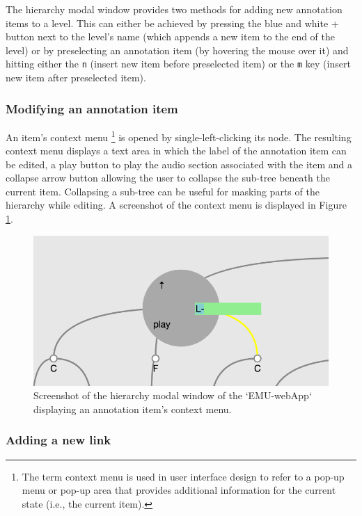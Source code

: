 \documentclass[]{book}
\let\rmarkdownfootnote\footnote%
\def\footnote{\protect\rmarkdownfootnote}
\begin{document}
The hierarchy modal window provides two methods for adding new annotation items to a level. This can either be achieved by pressing the blue and white + button next to the level's name (which appends a new item to the end of the level) or by preselecting an annotation item (by hovering the mouse over it) and hitting either the \texttt{n} (insert new item before preselected item) or the \texttt{m} key (insert new item after preselected item).

\hypertarget{modifying-an-annotation-item}{%
\subsubsection{Modifying an annotation item}\label{modifying-an-annotation-item}}

An item's context menu \footnote{The term context menu is used in user interface design to refer to a pop-up menu or pop-up area that provides additional information for the current state (i.e., the current item).} is opened by single-left-clicking its node. The resulting context menu displays a text area in which the label of the annotation item can be edited, a play button to play the audio section associated with the item and a collapse arrow button allowing the user to collapse the sub-tree beneath the current item. Collapsing a sub-tree can be useful for masking parts of the hierarchy while editing. A screenshot of the context menu is displayed in Figure \ref{fig:webApp-hierContextMenu}.

\begin{figure}

{\centering \includegraphics[width=0.65\linewidth]{pics/emu-webAppHierContextMenu} 

}

\caption{Screenshot of the hierarchy modal window of the `EMU-webApp` displaying an annotation item's context menu.}\label{fig:webApp-hierContextMenu}
\end{figure}

\hypertarget{adding-a-new-link}{%
\subsubsection{Adding a new link}\label{adding-a-new-link}}
\end{document}

